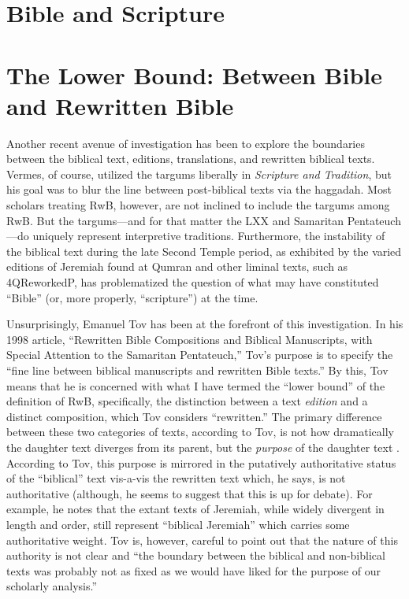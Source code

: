 \section{Bible and Scripture}\label{bible-and-scripture}

\section{The Lower Bound: Between Bible and Rewritten
Bible}\label{the-lower-bound-between-bible-and-rewritten-bible}

Another recent avenue of investigation has been to explore the
boundaries between the biblical text, editions, translations, and
rewritten biblical texts. Vermes, of course, utilized the targums
liberally in \emph{Scripture and Tradition}, but his goal was to blur
the line between post-biblical texts via the haggadah. Most scholars
treating RwB, however, are not inclined to include the targums among
RwB. But the targums---and for that matter the LXX and Samaritan
Pentateuch---do uniquely represent interpretive traditions. Furthermore,
the instability of the biblical text during the late Second Temple
period, as exhibited by the varied editions of Jeremiah found at Qumran
and other liminal texts, such as 4QReworkedP, has problematized the
question of what may have constituted ``Bible'' (or, more properly,
``scripture'') at the time.

Unsurprisingly, Emanuel Tov has been at the forefront of this
investigation. In his 1998 article, ``Rewritten Bible Compositions and
Biblical Manuscripts, with Special Attention to the Samaritan
Pentateuch,'' Tov's purpose is to specify the ``fine line between
biblical manuscripts and rewritten Bible
texts.''\autocite[334]{tov_dsd1998} By this, Tov means that he is
concerned with what I have termed the ``lower bound'' of the definition
of RwB, specifically, the distinction between a text \emph{edition} and
a distinct composition, which Tov considers ``rewritten.'' The primary
difference between these two categories of texts, according to Tov, is
not how dramatically the daughter text diverges from its parent, but the
\emph{purpose} of the daughter text \autocite[334]{tov_dsd1998}.
According to Tov, this purpose is mirrored in the putatively
authoritative status of the ``biblical'' text vis-a-vis the rewritten
text which, he says, is not authoritative (although, he seems to suggest
that this is up for debate\autocite[337]{tov_dsd1998}). For example, he
notes that the extant texts of Jeremiah, while widely divergent in
length and order, still represent ``biblical Jeremiah'' which carries
some authoritative weight. Tov is, however, careful to point out that
the nature of this authority is not clear and ``the boundary between the
biblical and non-biblical texts was probably not as fixed as we would
have liked for the purpose of our scholarly
analysis.''\autocite[335]{tov_dsd1998}

